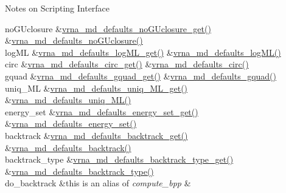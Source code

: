 \begin{DoxyRefDesc}{Notes on Scripting Interface}
\begin{longtabu}
no\+G\+Uclosure &\hyperlink{group__model__details_ga4f7fdad083243a5348d63320ddaa70f3}{vrna\+\_\+md\+\_\+defaults\+\_\+no\+G\+Uclosure\+\_\+get()} &\hyperlink{group__model__details_gade5b9951d71ca2fb357a4e6c0c18ccd1}{vrna\+\_\+md\+\_\+defaults\+\_\+no\+G\+Uclosure()} \\
log\+ML &\hyperlink{group__model__details_ga93f04e070d529c5d0bb87c9681f6ad29}{vrna\+\_\+md\+\_\+defaults\+\_\+log\+M\+L\+\_\+get()} &\hyperlink{group__model__details_ga3de50a73455d88c3957386933b8e1f90}{vrna\+\_\+md\+\_\+defaults\+\_\+log\+M\+L()} \\
circ &\hyperlink{group__model__details_gad3a7e58de344ad93a08925f58f94f6fb}{vrna\+\_\+md\+\_\+defaults\+\_\+circ\+\_\+get()} &\hyperlink{group__model__details_ga4e1deb3e91a8a99e5c6dd905a5eb0186}{vrna\+\_\+md\+\_\+defaults\+\_\+circ()} \\
gquad &\hyperlink{group__model__details_gae645b8612f879eb38b45244fa9eddb9e}{vrna\+\_\+md\+\_\+defaults\+\_\+gquad\+\_\+get()} &\hyperlink{group__model__details_ga0685ca2aeb39af76f2421fc308163dce}{vrna\+\_\+md\+\_\+defaults\+\_\+gquad()} \\
uniq\+\_\+\+ML &\hyperlink{group__model__details_gab48e70fd024bf838404bcbcca0c874a0}{vrna\+\_\+md\+\_\+defaults\+\_\+uniq\+\_\+\+M\+L\+\_\+get()} &\hyperlink{group__model__details_ga59b944f61c5d2babec2d4c48c820de67}{vrna\+\_\+md\+\_\+defaults\+\_\+uniq\+\_\+\+M\+L()} \\
energy\+\_\+set &\hyperlink{group__model__details_ga017ed6afb1cba2b7f242412cab618b53}{vrna\+\_\+md\+\_\+defaults\+\_\+energy\+\_\+set\+\_\+get()} &\hyperlink{group__model__details_ga8dd29c55787a4576277e1907e92d810c}{vrna\+\_\+md\+\_\+defaults\+\_\+energy\+\_\+set()} \\
backtrack &\hyperlink{group__model__details_ga90da1156e6883ddd68527c2830706648}{vrna\+\_\+md\+\_\+defaults\+\_\+backtrack\+\_\+get()} &\hyperlink{group__model__details_ga978c468b2fe96a70d5191e3dd17d5599}{vrna\+\_\+md\+\_\+defaults\+\_\+backtrack()} \\
backtrack\+\_\+type &\hyperlink{group__model__details_ga1425b4ebd0e034dead66d79becd64143}{vrna\+\_\+md\+\_\+defaults\+\_\+backtrack\+\_\+type\+\_\+get()} &\hyperlink{group__model__details_ga68305274de96b56b7799575e222560d8}{vrna\+\_\+md\+\_\+defaults\+\_\+backtrack\+\_\+type()} \\
do\+\_\+backtrack &this is an alias of {\itshape compute\+\_\+bpp} &\\

\end{longtabu}
\end{DoxyRefDesc}
